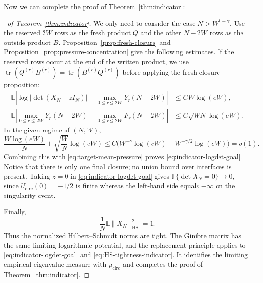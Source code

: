 \documentclass[11pt,reqno]{amsart}
\numberwithin{equation}{section}
\theoremstyle{definition}
\theoremstyle{remark}
\newcommand{\E}{\mathbb E}
\newcommand{\Pp}{\mathbb P}
\newcommand{\1}{\mathbf 1}
\newcommand{\HS}{\mathrm{HS}}
\newcommand{\cir}{\mathrm{circ}}
\DeclareMathOperator{\tr}{tr}
\begin{document}
Now we can complete the proof of Theorem~\ref{thm:indicator}:
\begin{proof}[\proofname\ of Theorem~\ref{thm:indicator}]
We only need to consider the case \(N>W^{1+\gamma}\).
Use the reserved $2W$ rows as the fresh product $Q$ and the other $N-2W$ rows
as the outside product $B$.  Proposition~\ref{prop:fresh-closure} and
Proposition~\ref{prop:pressure-concentration} give the following estimates.
If the reserved rows occur at the end of the written product, we use
$\tr(Q^{(r)}B^{(r)})=\tr(B^{(r)}Q^{(r)})$ before applying the fresh-closure
proposition:
\begin{align}
 \E\left|\log|\det(X_N-zI_N)|-\max_{0\le r\le 2W}Y_r(N-2W)\right|
 &\le CW\log(eW),                                           \label{eq:final-seam}\\
 \E\left|\max_{0\le r\le 2W}Y_r(N-2W)-\max_{0\le r\le 2W}F_r(N-2W)\right|
 &\le C\sqrt{WN}\log(eW).                                  \label{eq:final-pressure-fluctuation}
\end{align}
In the given regime of $(N,W)$,
\[
 \frac{W\log(eW)}N+\sqrt{\frac WN}\log(eW)
 \le C\big(W^{-\gamma}\log(eW)+W^{-\gamma/2}\log(eW)\big)=o(1).
\]
Combining this with \eqref{eq:target-mean-pressure} proves
\eqref{eq:indicator-logdet-goal}.  Notice that there is only one final
closure; no union bound over interfaces is present.
Taking \(z=0\) in \eqref{eq:indicator-logdet-goal} gives
\(\Pp\{\det X_N=0\}\to0\), since
\(U_{\cir}(0)=-1/2\) is finite whereas the left-hand side equals
\(-\infty\) on the singularity event.

Finally,
\begin{equation}\label{eq:HS-tightness-indicator}
 \frac1N\E\|X_N\|_{\HS}^2=1.
\end{equation}
Thus the normalized Hilbert--Schmidt norms are tight.  The Ginibre matrix
has the same limiting logarithmic potential, and the replacement principle
\cite[Theorem~4.1]{Han2410} applies to
\eqref{eq:indicator-logdet-goal} and \eqref{eq:HS-tightness-indicator}.
It identifies the limiting empirical eigenvalue measure with
\(\mu_{\cir}\) and completes the proof of
Theorem~\ref{thm:indicator}.
\end{proof}
\end{document}
